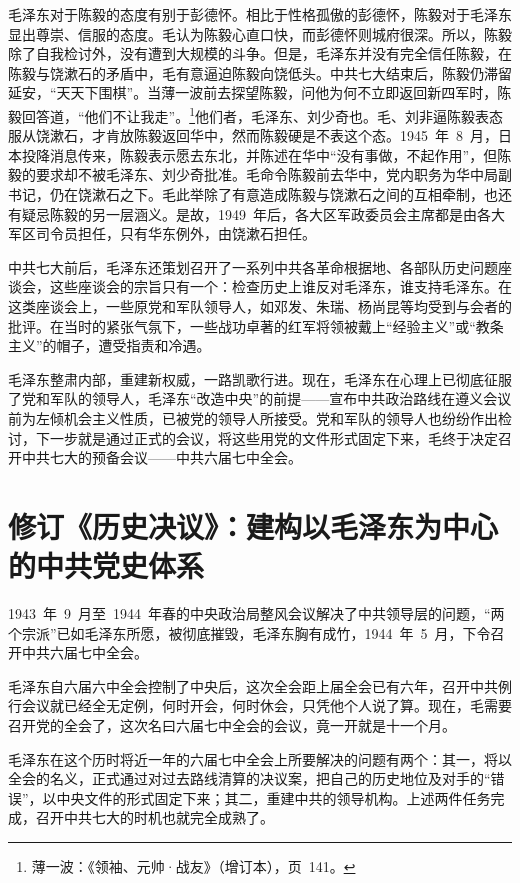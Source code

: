 毛泽东对于陈毅的态度有别于彭德怀。相比于性格孤傲的彭德怀，陈毅对于毛泽东显出尊崇、信服的态度。毛认为陈毅心直口快，而彭德怀则城府很深。所以，陈毅除了自我检讨外，没有遭到大规模的斗争。但是，毛泽东并没有完全信任陈毅，在陈毅与饶漱石的矛盾中，毛有意逼迫陈毅向饶低头。中共七大结束后，陈毅仍滞留延安，“天天下围棋”。当薄一波前去探望陈毅，问他为何不立即返回新四军时，陈毅回答道，“他们不让我走”。\footnote{薄一波：《领袖、元帅·战友》（增订本），页~141。}他们者，毛泽东、刘少奇也。毛、刘非逼陈毅表态服从饶漱石，才肯放陈毅返回华中，然而陈毅硬是不表这个态。1945~年~8~月，日本投降消息传来，陈毅表示愿去东北，并陈述在华中“没有事做，不起作用”，但陈毅的要求却不被毛泽东、刘少奇批准。毛命令陈毅前去华中，党内职务为华中局副书记，仍在饶漱石之下。毛此举除了有意造成陈毅与饶漱石之间的互相牵制，也还有疑忌陈毅的另一层涵义。是故，1949~年后，各大区军政委员会主席都是由各大军区司令员担任，只有华东例外，由饶漱石担任。

中共七大前后，毛泽东还策划召开了一系列中共各革命根据地、各部队历史问题座谈会，这些座谈会的宗旨只有一个：检查历史上谁反对毛泽东，谁支持毛泽东。在这类座谈会上，一些原党和军队领导人，如邓发、朱瑞、杨尚昆等均受到与会者的批评。在当时的紧张气氛下，一些战功卓著的红军将领被戴上“经验主义”或“教条主义”的帽子，遭受指责和冷遇。

毛泽东整肃内部，重建新权威，一路凯歌行进。现在，毛泽东在心理上已彻底征服了党和军队的领导人，毛泽东“改造中央”的前提——宣布中共政治路线在遵义会议前为左倾机会主义性质，已被党的领导人所接受。党和军队的领导人也纷纷作出检讨，下一步就是通过正式的会议，将这些用党的文件形式固定下来，毛终于决定召开中共七大的预备会议——中共六届七中全会。

\section{修订《历史决议》：建构以毛泽东为中心的中共党史体系}

1943~年~9~月至~1944~年春的中央政治局整风会议解决了中共领导层的问题，“两个宗派”已如毛泽东所愿，被彻底摧毁，毛泽东胸有成竹，1944~年~5~月，下令召开中共六届七中全会。

毛泽东自六届六中全会控制了中央后，这次全会距上届全会已有六年，召开中共例行会议就已经全无定例，何时开会，何时休会，只凭他个人说了算。现在，毛需要召开党的全会了，这次名曰六届七中全会的会议，竟一开就是十一个月。

毛泽东在这个历时将近一年的六届七中全会上所要解决的问题有两个：其一，将以全会的名义，正式通过对过去路线清算的决议案，把自己的历史地位及对手的“错误”，以中央文件的形式固定下来；其二，重建中共的领导机构。上述两件任务完成，召开中共七大的时机也就完全成熟了。

